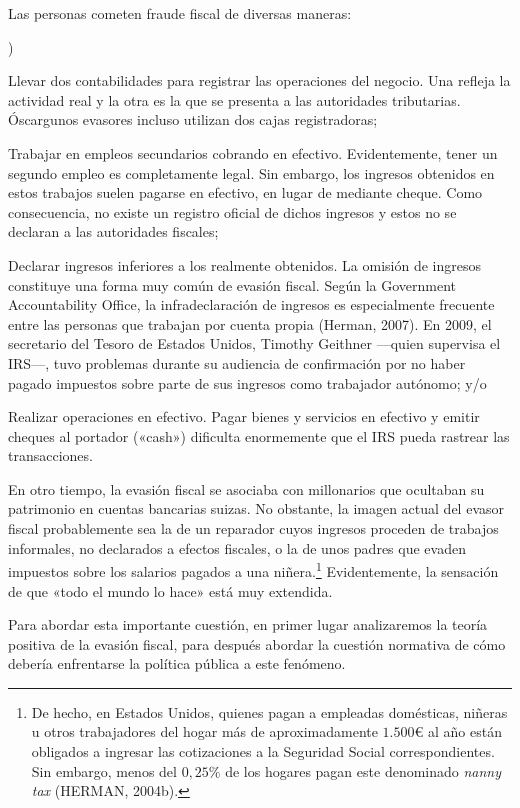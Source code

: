 \documentclass[10pt,a4paper]{article}
\newcounter{alphaitem}
\newenvironment{la}
      {\begin{list}{\alph{alphaitem})}{%
          \usecounter{alphaitem}%
          \setlength{\leftmargin}{1cm}%
          \setlength{\parskip}{3pt}%
          \setlength{\itemsep}{0pt}%
          \setlength{\parsep}{0pt}%
      }}
      {\end{list}}
\begin{document}
Las personas cometen fraude fiscal de diversas maneras:
\begin{la}
    \item Llevar dos contabilidades para registrar las operaciones del negocio. Una refleja la actividad real y la otra es la que se presenta a las autoridades tributarias. Óscargunos evasores incluso utilizan dos cajas registradoras;
    \item Trabajar en empleos secundarios cobrando en efectivo. Evidentemente, tener un segundo empleo es completamente legal. Sin embargo, los ingresos obtenidos en estos trabajos suelen pagarse en efectivo, en lugar de mediante cheque. Como consecuencia, no existe un registro oficial de dichos ingresos y estos no se declaran a las autoridades fiscales;
    \item Declarar ingresos inferiores a los realmente obtenidos. La omisión de ingresos constituye una forma muy común de evasión fiscal. Según la Government Accountability Office, la infradeclaración de ingresos es especialmente frecuente entre las personas que trabajan por cuenta propia (Herman, 2007). En 2009, el secretario del Tesoro de Estados Unidos, Timothy Geithner —quien supervisa el IRS—, tuvo problemas durante su audiencia de confirmación por no haber pagado impuestos sobre parte de sus ingresos como trabajador autónomo; y/o
    \item Realizar operaciones en efectivo. Pagar bienes y servicios en efectivo y emitir cheques al portador («cash») dificulta enormemente que el IRS pueda rastrear las transacciones.
\end{la}

En otro tiempo, la evasión fiscal se asociaba con millonarios que ocultaban su patrimonio en cuentas bancarias suizas. No obstante, la imagen actual del evasor fiscal probablemente sea la de un reparador cuyos ingresos proceden de trabajos informales, no declarados a efectos fiscales, o la de unos padres que evaden impuestos sobre los salarios pagados a una niñera.\footnote{%
    De hecho, en Estados Unidos, quienes pagan a empleadas domésticas, niñeras u otros trabajadores del hogar más de aproximadamente $1.500€$ al año están obligados a ingresar las cotizaciones a la Seguridad Social correspondientes. Sin embargo, menos del $0,25\%$ de los hogares pagan este denominado \textit{nanny tax} (HERMAN, 2004b).
} Evidentemente, la sensación de que «todo el mundo lo hace» está muy extendida.

Para abordar esta importante cuestión, en primer lugar analizaremos la teoría positiva de la evasión fiscal, para después abordar la cuestión normativa de cómo debería enfrentarse la política pública a este fenómeno.
\end{document}
